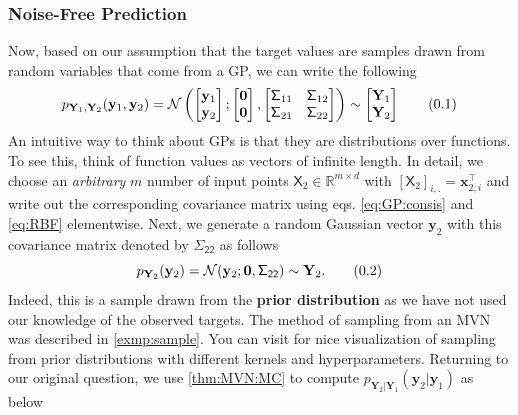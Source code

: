 \documentclass[10pt]{article}
\theoremstyle{definition}
\newcommand\eqnum{\addtocounter{equation}{1}\tag{\arabic{section}.\arabic{equation}}}
\begin{document}
\subsubsection{Noise-Free Prediction}
Now, based on our assumption that the target values are samples drawn from random variables that come from a GP, we can write the following
\begin{equation*}
p_{\mathbf{Y}_{1}, \mathbf{Y}_{2}}(\mathbf{y}_{1}, \mathbf{y}_{2}) =
\mathcal{N} \left(
\begin{bmatrix}
\mathbf{y}_1 \\
\mathbf{y}_2
\end{bmatrix} ;
\begin{bmatrix}
\mathbf{0} \\
\mathbf{0}
\end{bmatrix} ,
\begin{bmatrix}
\mathsf{\Sigma}_{11} & \mathsf{\Sigma}_{12} \\
\mathsf{\Sigma}_{21} & \mathsf{\Sigma}_{22} 
\end{bmatrix}
\right) \sim
\begin{bmatrix}
\mathbf{Y}_1 \\
\mathbf{Y}_2
\end{bmatrix}
\eqnum
\label{eq:GP:joint}
\end{equation*}
An intuitive way to think about GPs is that they are distributions over functions. To see this, think of function values as vectors of infinite length. In detail, we choose an \textit{arbitrary} $m$ number of input points $\mathsf{X}_2 \in \mathbb{R}^{m\times d}$ with $[\mathsf{X}_2]_{i,.}=\mathbf{x}_{2,i}^{\top}$ and write out the corresponding covariance matrix using eqs. \eqref{eq:GP:consis} and \eqref{eq:RBF} elementwise. Next, we generate a random Gaussian vector $\mathbf{y}_{2}$ with this covariance matrix denoted by $\mathsf{\Sigma_{22}}$ as follows
\begin{equation*}
p_{\mathbf{Y}_{2}}(\mathbf{y}_{2}) = \mathcal{N}(\mathbf{y}_{2}; \mathbf{0}, \mathsf{\Sigma_{22}}) \sim \mathbf{Y}_{2}.
\eqnum
\label{eq:GP:prior}
\end{equation*}
Indeed, this is a sample drawn from the \textbf{prior distribution} as we have not used our knowledge of the observed targets. The method of sampling from an MVN was described in \cref{exmp:sample}. You can visit \cite{Gortler2019} for nice visualization of sampling from prior distributions with different kernels and hyperparameters. Returning to our original question, we use \cref{thm:MVN:MC} to compute $p_{\mathbf{Y}_2|\mathbf{Y}_1}(\mathbf{y}_2|\mathbf{y}_1)$ as below
\end{document}
